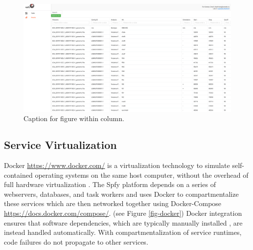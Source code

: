 \documentclass[a4,center,fleqn]{NAR}
\begin{document}
\begin{figure}[t]
\begin{center}
\includegraphics{images/tables.png}
\end{center}
\caption{Caption for figure within column.}
\label{fig-tables}
\end{figure}

\subsection{Service Virtualization}



Docker \url{https://www.docker.com/} is a virtualization technology to simulate self-contained operating systems on the same host computer, without the overhead of full hardware virtualization \citep{felter2015updated}.
The Spfy platform depends on a series of webservers, databases, and task workers and uses Docker to compartmentalize these services which are then networked together using Docker-Compose \url{https://docs.docker.com/compose/}.
(see Figure \ref{fig-docker})
Docker integration ensures that software dependencies, which are typically manually installed \citep{doi:10.1093/bioinformatics/btu153,laing2010pan,inouye2014srst2,naccache2014cloud}, are instead handled automatically. With compartmentalization of service runtimes, code failures do not propagate to other services.
\end{document}
